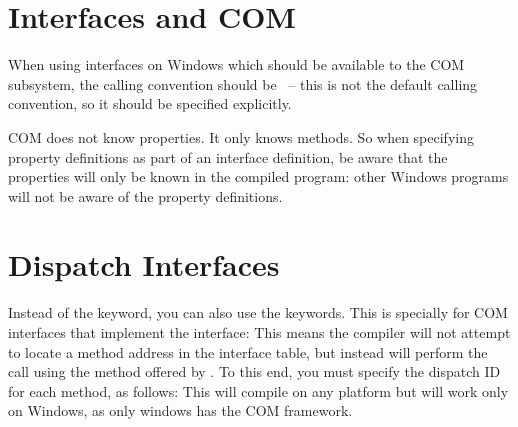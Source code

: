 \section{Interfaces and COM}
When using interfaces on Windows which should be available to the COM
subsystem, the calling convention should be ~-- this is not the
default \fpc calling convention, so it should be specified explicitly.

COM does not know properties. It only knows methods. So when specifying
property definitions as part of an interface definition, be aware that the
properties will only be known in the \fpc compiled program: other Windows
programs will not be aware of the property definitions.

\section{Dispatch Interfaces}

Instead of the  keyword, you can also use the  keywords. 
This is specially for COM interfaces that implement the  interface:
This means the compiler will not attempt to locate a method address in the interface table, 
but instead will perform the call using the  method offered by . 
To this end, you must specify the dispatch ID for each method, as follows:
This will compile on any platform but will work only on Windows, as only windows has the COM framework.

